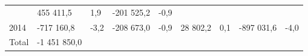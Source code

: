 \begin{longtable}[]{@{}lllllllll@{}}
\begin{minipage}[t]{0.06\columnwidth}
\end{minipage} & \begin{minipage}[t]{0.12\columnwidth}\raggedright
455 411,5\strut
\end{minipage} & \begin{minipage}[t]{0.06\columnwidth}\raggedright
1,9\strut
\end{minipage} & \begin{minipage}[t]{0.10\columnwidth}\raggedright
-201 525,2\strut
\end{minipage} & \begin{minipage}[t]{0.06\columnwidth}\raggedright
-0,9\strut
\end{minipage}\tabularnewline
\begin{minipage}[t]{0.05\columnwidth}\raggedright
2014\strut
\end{minipage} & \begin{minipage}[t]{0.10\columnwidth}\raggedright
-717 160,8\strut
\end{minipage} & \begin{minipage}[t]{0.06\columnwidth}\raggedright
-3,2\strut
\end{minipage} & \begin{minipage}[t]{0.16\columnwidth}\raggedright
-208 673,0\strut
\end{minipage} & \begin{minipage}[t]{0.06\columnwidth}\raggedright
-0,9\strut
\end{minipage} & \begin{minipage}[t]{0.12\columnwidth}\raggedright
28 802,2\strut
\end{minipage} & \begin{minipage}[t]{0.06\columnwidth}\raggedright
0,1\strut
\end{minipage} & \begin{minipage}[t]{0.10\columnwidth}\raggedright
-897 031,6\strut
\end{minipage} & \begin{minipage}[t]{0.06\columnwidth}\raggedright
-4,0\strut
\end{minipage}\tabularnewline
\begin{minipage}[t]{0.05\columnwidth}\raggedright
Total\strut
\end{minipage} & \begin{minipage}[t]{0.10\columnwidth}\raggedright
-1 451 850,0\strut
\end{minipage} & \begin{minipage}[t]{0.06\columnwidth}\raggedright
\strut
\end{minipage} & \begin{minipage}[t]{0.16\columnwidth}\raggedright

\end{minipage}
\end{longtable}
